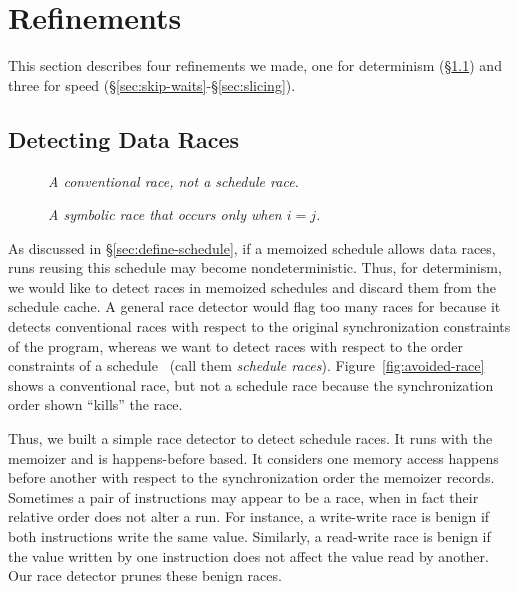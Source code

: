 \section{Refinements} \label{sec:impl}

This section describes four refinements we made, one for
determinism (\S\ref{sec:detect-race}) and three for speed
(\S\ref{sec:skip-waits}-\S\ref{sec:slicing}).

\subsection{Detecting Data Races} \label{sec:detect-race}

\begin{figure}
\begin{minipage}[t]{0.45\linewidth}
\tiny
{}
\caption{\small\em A conventional race, not a schedule race.}
\label{fig:avoided-race}
\end{minipage}
\hfill
\begin{minipage}[t]{0.48\linewidth}
\tiny 
{}
\vspace{-.2in}
\caption{\small\em A symbolic race that occurs only when $i=j$.}
\label{fig:symbolic-race}
\end{minipage}
\vspace{-.2in}
\end{figure}

As discussed in \S\ref{sec:define-schedule}, if a memoized schedule allows
data races, runs reusing this schedule may become nondeterministic.  Thus,
for determinism, we would like to detect races in memoized schedules and
discard them from the schedule cache.  A general race detector would flag
too many races for \tern because it detects conventional races with respect
to the original synchronization constraints of the program, whereas we
want to detect races with respect to the order constraints of a
schedule~\cite{recplay:tocs} (call them \emph{schedule races}).
Figure~\ref{fig:avoided-race} shows a conventional race, but not a
schedule race because the synchronization order shown ``kills'' the race.

Thus, we built a simple race detector to detect schedule races.  It runs
with the memoizer and is happens-before based.  It considers one memory
access happens before another with respect to the synchronization order
the memoizer records.  Sometimes a pair of instructions may appear to be a
race, when in fact their relative order does not alter a run.  For
instance, a write-write race is benign if both instructions write the same
value.  Similarly, a read-write race is benign if the value written by one
instruction does not affect the value read by another.  Our race detector
prunes these benign races.

